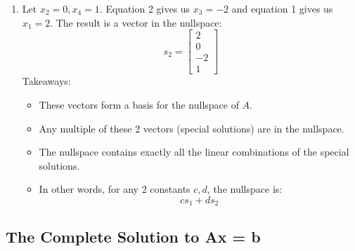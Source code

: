 \documentclass[11pt]{article}
\begin{document}
\begin{enumerate}
\begin{enumerate}
        \item Let $x_2 = 0, x_4 = 1$. Equation 2 gives us $x_3 = -2$ and equation 1 gives us 
        $x_1 = 2$. The result is a vector in the nullspace: \[ s_2 = \begin{bmatrix}
            2 \\
            0 \\
            -2 \\
            1
        \end{bmatrix}
    \]
    Takeaways: 
    \begin{itemize}
        \item These vectors form a basis for the nullspace of $A$. 
        \item Any multiple of these 2 vectors (special solutions) are in the nullspace.
        \item The nullspace contains exactly all the linear combinations of the special solutions. 
        \item In other words, for any 2 constants $c, d$, the nullspace is: \[ cs_1 + ds_2 \]
    \end{itemize} 
    \end{enumerate}
\end{enumerate}

\subsection{The Complete Solution to Ax = b}
\end{document}
